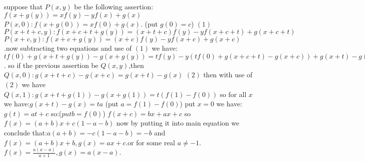 \begin{mysolution}
	suppose that $P(x,y)$ be the following assertion:$f(x+g(y))=xf(y)-yf(x)+g(x)$
$P(x,0):f(x+g(0))=xf(0)+g(x)$. (put $g(0)=c$)      $(1)$
$P(x+t+c,y):f(x+c+t+g(y))=(x+t+c)f(y)-yf(x+c+t)+g(x+c+t)$
$P(x+c,y):f(x+c+g(y))=(x+c)f(y)-yf(x+c)+g(x+c)$.now subtracting two equations and use of $(1)$ we have:$tf(0)+g(x+t+g(y))-g(x+g(y))=tf(y)-y(tf(0)+g(x+c+t)-g(x+c))+g(x+t)-g(x)$.
so if the previous assertion be $Q(x,y)$,then
$Q(x,0):g(x+t+c)-g(x+c)=g(x+t)-g(x)$ $(2)$    
then with use of $(2)$ we have $Q(x,1):g(x+t+g(1))-g(x+g(1))=t(f(1)-f(0))$ so for all $x$ we have:$g(x+t)-g(x)=ta$ (put $a=f(1)-f(0)$) put $x=0$ we have:$g(t)=at+c$ so:($put b=f(0)$)
$f(x+c)=bx+ax+c$ so $f(x)=(a+b)x+c(1-a-b)$ now by putting it into main equation we conclude that:$a(a+b)=-c(1-a-b)=-b$ and $f(x)=(a+b)x+b,g(x)=ax+c$.or for some real $a\neq -1$.$f(x)=\frac{a(x-a)}{a+1},g(x)=a(x-a)$.
\end{mysolution}



